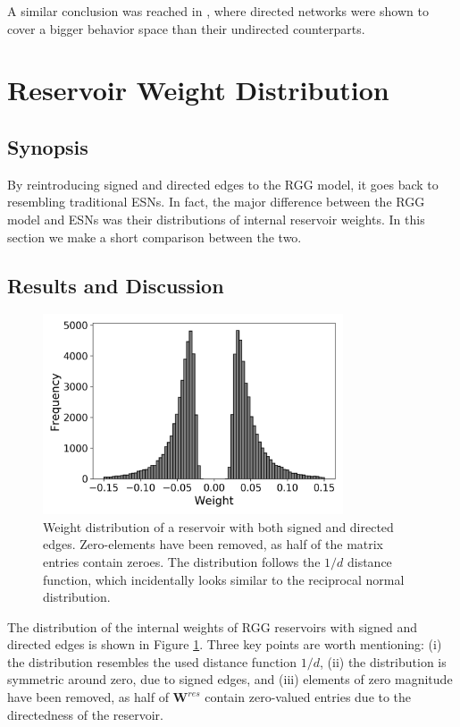 A similar conclusion was reached in \cite{mcquillan_role_2019}, where directed
networks were shown to cover a bigger behavior space than their undirected
counterparts.

\section{Reservoir Weight Distribution}
\label{sec:rwd}

\subsection{Synopsis}

By reintroducing signed and directed edges to the RGG model, it goes back to
resembling traditional ESNs. In fact, the major difference between the RGG model
and ESNs was their distributions of internal reservoir weights. In this section
we make a short comparison between the two.

\subsection{Results and Discussion}

\begin{figure}[htb]
  \centering
  \includegraphics[width=3.5in]{figures/rgg-dist.png}
  \caption{
    Weight distribution of a reservoir with both signed and directed
edges. Zero-elements have been removed, as half of the matrix entries contain
zeroes. The distribution follows the $1/d$ distance function, which incidentally
looks similar to the reciprocal normal distribution.
  }
  \label{fig:rgg-dist}
\end{figure}

The distribution of the internal weights of RGG reservoirs with signed and
directed edges is shown in Figure \ref{fig:rgg-dist}. Three key points are worth
mentioning: (i) the distribution resembles the used distance function $1/d$,
(ii) the distribution is symmetric around zero, due to signed edges, and (iii)
elements of zero magnitude have been removed, as half of $\mathbf{W}^{res}$
contain zero-valued entries due to the directedness of the reservoir.

